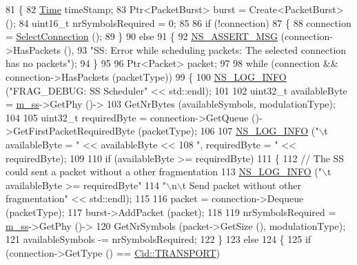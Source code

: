 \begin{DoxyCode}
81 \{
82   \hyperlink{namespacens3_1_1TracedValueCallback_a7ffd3e7c142ffe7c8a1d2db9b8de38ec}{Time} timeStamp;
83   Ptr<PacketBurst> burst = Create<PacketBurst> ();
84   uint16\_t nrSymbolsRequired = 0;
85 
86   \textcolor{keywordflow}{if} (!connection)
87     \{
88       connection = \hyperlink{classns3_1_1SSScheduler_ac66b795f13ed11290d5401e98a8746ea}{SelectConnection} ();
89     \}
90   \textcolor{keywordflow}{else}
91     \{
92       \hyperlink{assert_8h_aff5ece9066c74e681e74999856f08539}{NS\_ASSERT\_MSG} (connection->HasPackets (),
93                      \textcolor{stringliteral}{"SS: Error while scheduling packets: The selected connection has no packets"});
94     \}
95 
96   Ptr<Packet> packet;
97 
98   \textcolor{keywordflow}{while} (connection && connection->HasPackets (packetType))
99     \{
100       \hyperlink{group__logging_gafbd73ee2cf9f26b319f49086d8e860fb}{NS\_LOG\_INFO} (\textcolor{stringliteral}{"FRAG\_DEBUG: SS Scheduler"} << std::endl);
101 
102       uint32\_t availableByte = \hyperlink{classns3_1_1SSScheduler_a9a0b3cae20f18593e3d150e7534ce678}{m\_ss}->GetPhy ()->
103         GetNrBytes (availableSymbols, modulationType);
104 
105       uint32\_t requiredByte = connection->GetQueue ()->GetFirstPacketRequiredByte (packetType);
106 
107       \hyperlink{group__logging_gafbd73ee2cf9f26b319f49086d8e860fb}{NS\_LOG\_INFO} (\textcolor{stringliteral}{"\(\backslash\)t availableByte = "} << availableByte <<
108                    \textcolor{stringliteral}{", requiredByte = "} << requiredByte);
109 
110       \textcolor{keywordflow}{if} (availableByte >= requiredByte)
111         \{
112           \textcolor{comment}{// The SS could sent a packet without a other fragmentation}
113           \hyperlink{group__logging_gafbd73ee2cf9f26b319f49086d8e860fb}{NS\_LOG\_INFO} (\textcolor{stringliteral}{"\(\backslash\)t availableByte >= requiredByte"}
114                        \textcolor{stringliteral}{"\(\backslash\)n\(\backslash\)t Send packet without other fragmentation"} << std::endl);
115 
116           packet = connection->Dequeue (packetType);
117           burst->AddPacket (packet);
118 
119           nrSymbolsRequired = \hyperlink{classns3_1_1SSScheduler_a9a0b3cae20f18593e3d150e7534ce678}{m\_ss}->GetPhy ()->
120             GetNrSymbols (packet->GetSize (), modulationType);
121           availableSymbols -= nrSymbolsRequired;
122         \}
123       \textcolor{keywordflow}{else}
124         \{
125           \textcolor{keywordflow}{if} (connection->GetType () == \hyperlink{classns3_1_1Cid_a10b8f92080ca5790e65a0bfa2f557e0aa46fbed56841c3bf471aa84de022edf87}{Cid::TRANSPORT})

\end{DoxyCode}
